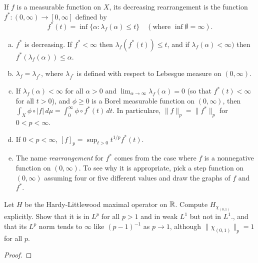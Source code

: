 \documentclass{article}
\begin{document}
 If $f$ is a measurable function on $X$, its decreasing rearrangement is the function $f^*: (0,\infty) \to [0,\infty]$ defined by 
$$f^*(t) = \inf\{\alpha : \lambda_f(\alpha) \le t\} \quad (\text{where } \inf \emptyset = \infty).$$
\begin{enumerate}[a.]
\item $f^*$ is decreasing. If $f^* < \infty$ then $\lambda_f(f^*(t)) \le t$, and if $\lambda_f(\alpha) < \infty)$ then $f^*(\lambda_f(\alpha)) \le \alpha$.
\item $\lambda_f = \lambda_{f^*}$, where $\lambda_{f^*}$ is defined with respect to Lebesgue measure on $(0,\infty)$.
\item If $\lambda_f(\alpha) < \infty$ for all $\alpha > 0$ and $\lim_{\alpha \to \infty} \lambda_f(\alpha) = 0$ (so that $f^*(t) < \infty$ for all $t > 0$), and 
$\phi \ge 0$ is a Borel measurable function on $(0,\infty)$, then $\int_X \phi \circ |f| \, d\mu = \int_0^\infty \phi \circ f^*(t) \, dt$. In particulare,
$\|f\|_p = \|f^*\|_p$ for $0 < p < \infty$.
\item If $0<p < \infty$, $[f]_p = \sup_{t > 0} t^{1/p} f^*(t)$.
\item The name \emph{rearrangement} for $f^*$ comes from the case where $f$ is a nonnegative function on $(0,\infty)$. To see why it is appropriate, pick
a step function on $(0, \infty)$ assuming four or five different values and draw the graphs of $f$ and $f^*$.
\end{enumerate}

 Let $H$ be the Hardy-Littlewood maximal operator on $\mathbb{R}$. Compute $H_{\chi_{(0,1)}}$ explicitly. 
Show that it is in $L^p$ for all $p > 1$ and in weak $L^1$ but not in $L^1$., and that its $L^p$ norm tends to $\infty$ 
like $(p-1)^{-1}$ as $p \to 1$, although $\|\chi_{(0,1)}\|_p = 1$ for all $p$.
\begin{proof}
\end{proof}
\end{document}
